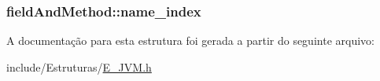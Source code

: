 \subsubsection[{name\+\_\+index}]{ field\+And\+Method\+::name\+\_\+index}\label{structfield_and_method_ac636d7076db5a2ce9891613be8ad9b00}


A documentação para esta estrutura foi gerada a partir do seguinte arquivo\+:\begin{DoxyCompactItemize}
\item 
include/\+Estruturas/\hyperlink{_e___j_v_m_8h}{E\+\_\+\+J\+V\+M.\+h}\end{DoxyCompactItemize}
